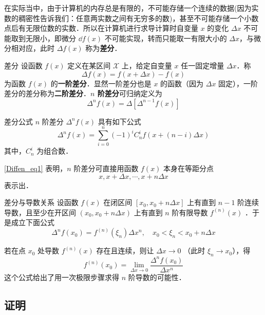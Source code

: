 在实际当中，由于计算机的内存总是有限的，不可能存储一个连续的数据(因为实数的稠密性告诉我们：任意两实数之间有无穷多的数)，甚至不可能存储一个小数点后有无限位数的实数．所以在计算机进行求导计算时自变量 $x$ 的变化 $\Delta x$ 不可能取到无限小，即微分 $\dd f({x})$ 不可能实现，转而只能取一有限大小的 $\Delta x$，与微分相对应，此时 $\Delta f(x)$ 称为\textbf{差分}．
\begin{definition}{差分}
设函数 $f(x)$ 定义在某区间 $\mathcal{X}$ 上，给定自变量 $x$ 任一固定增量 $\Delta x$．称
\begin{equation}
\Delta f(x)=f(x+\Delta x)-f(x)
\end{equation}
为函数 $f(x)$ 的\textbf{一阶差分}．显然一阶差分也是 $x$ 的函数（因为 $\Delta x$ 固定），一阶差分的差分称为\textbf{二阶差分}．\textbf{$n$ 阶差分}可归纳定义为
\begin{equation}
\Delta^n f(x)=\Delta[\Delta^{n-1}f(x)]
\end{equation}
\end{definition}
\begin{theorem}{差分公式}\label{Diffen_the1}
$n$ 阶差分 $\Delta^n f(x)$ 具有如下公式
\begin{equation}\label{Diffen_eq1}
\Delta^nf(x)=\sum_{i=0}^n(-1)^iC_n^if(x+(n-i)\Delta x)
\end{equation}
其中，$C_n^i$ 为组合数．
\end{theorem}
\autoref{Diffen_eq1} 表明，$n$ 阶差分可直接用函数 $f(x)$ 本身在等距分点
\begin{equation}
x,x+\Delta x,\cdots,x+n\Delta x
\end{equation}
表示出．
\begin{theorem}{差分与导数关系}\label{Diffen_the2}
设函数 $f(x)$ 在闭区间 $[x_0,x_0+n\Delta x]$ 上有直到 $n-1$ 阶连续导数，且至少在开区间 $(x_0,x_0+n\Delta x)$ 上有直到 $n$ 阶有限导数 $f^{(n)}(x)$ ．于是成立下面公式
\begin{equation}\label{Diffen_eq2}
\Delta^nf(x_0)=f^{(n)}(\xi_n)\Delta x^n ,\quad x_0<\xi_n<x_0+n\Delta x
\end{equation}
\end{theorem}
若在点 $x_0$ 处导数 $f^{(n)}(x)$ 存在且连续，则让 $\Delta x\rightarrow0$ （此时 $\xi_n\rightarrow x_0$），得
\begin{equation}
f^{(n)}(x_0)=\lim_{\Delta x\rightarrow0}\frac{\Delta^n f(x_0)}{\Delta x^n}
\end{equation}
 这个公式给出了用一次极限步骤求得 $n$ 阶导数的可能性．
\subsection{证明}
